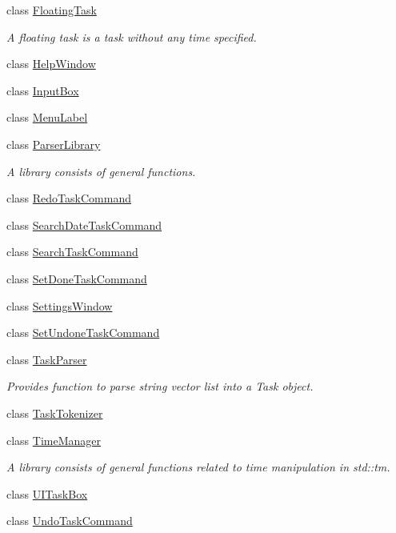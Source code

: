 \begin{DoxyCompactItemize}
class \hyperlink{class_do_lah_1_1_floating_task}{Floating\+Task}
\begin{DoxyCompactList}\small\item\em A floating task is a task without any time specified. \end{DoxyCompactList}\item 
class \hyperlink{class_do_lah_1_1_help_window}{Help\+Window}
\item 
class \hyperlink{class_do_lah_1_1_input_box}{Input\+Box}
\item 
class \hyperlink{class_do_lah_1_1_menu_label}{Menu\+Label}
\item 
class \hyperlink{class_do_lah_1_1_parser_library}{Parser\+Library}
\begin{DoxyCompactList}\small\item\em A library consists of general functions. \end{DoxyCompactList}\item 
class \hyperlink{class_do_lah_1_1_redo_task_command}{Redo\+Task\+Command}
\item 
class \hyperlink{class_do_lah_1_1_search_date_task_command}{Search\+Date\+Task\+Command}
\item 
class \hyperlink{class_do_lah_1_1_search_task_command}{Search\+Task\+Command}
\item 
class \hyperlink{class_do_lah_1_1_set_done_task_command}{Set\+Done\+Task\+Command}
\item 
class \hyperlink{class_do_lah_1_1_settings_window}{Settings\+Window}
\item 
class \hyperlink{class_do_lah_1_1_set_undone_task_command}{Set\+Undone\+Task\+Command}
\item 
class \hyperlink{class_do_lah_1_1_task_parser}{Task\+Parser}
\begin{DoxyCompactList}\small\item\em Provides function to parse string vector list into a Task object. \end{DoxyCompactList}\item 
class \hyperlink{class_do_lah_1_1_task_tokenizer}{Task\+Tokenizer}
\item 
class \hyperlink{class_do_lah_1_1_time_manager}{Time\+Manager}
\begin{DoxyCompactList}\small\item\em A library consists of general functions related to time manipulation in std\+::tm. \end{DoxyCompactList}\item 
class \hyperlink{class_do_lah_1_1_u_i_task_box}{U\+I\+Task\+Box}
\item 
class \hyperlink{class_do_lah_1_1_undo_task_command}{Undo\+Task\+Command}
\end{DoxyCompactItemize}
